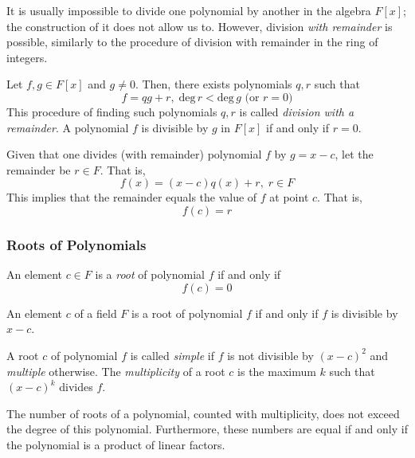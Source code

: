 \documentclass{article}
\begin{document}
      It is usually impossible to divide one polynomial by another in the algebra $F[x]$; the construction of it does not allow us to. However, division \textit{with remainder} is possible, similarly to the procedure of division with remainder in the ring of integers. 

      \begin{theorem}
        Let $f, g \in F[x]$ and $g \neq 0$. Then, there exists polynomials $q, r$ such that 
        \[ f = q g + r, \; \text{deg}\, r < \text{deg}\, g \text{ (or } r = 0 \text{)}\]
        This procedure of finding such polynomials $q, r$ is called \textit{division with a remainder}. A polynomial $f$ is divisible by $g$ in $F[x]$ if and only if $r = 0$. 
      \end{theorem}

      \begin{theorem}
        Given that one divides (with remainder) polynomial $f$ by $g = x - c$, let the remainder be $r \in F$. That is, 
        \[f(x) = (x-c) q(x) + r, \; r \in F\]
        This implies that the remainder equals the value of $f$ at point $c$. That is, 
        \[f(c) = r\]
      \end{theorem}

    \subsubsection{Roots of Polynomials}

      \begin{definition}
        An element $c \in F$ is a \textit{root} of polynomial $f$ if and only if 
        \[ f(c) = 0\]
      \end{definition}

      \begin{corollary}
        An element $c$ of a field $F$ is a root of polynomial $f$ if and only if $f$ is divisible by $x - c$. 
      \end{corollary}

      \begin{definition}
        A root $c$ of polynomial $f$ is called \textit{simple} if $f$ is not divisible by $(x-c)^2$ and \textit{multiple} otherwise. The \textit{multiplicity} of a root $c$ is the maximum $k$ such that $(x-c)^k$ divides $f$. 
      \end{definition}

      \begin{theorem}
        The number of roots of a polynomial, counted with multiplicity, does not exceed the degree of this polynomial. Furthermore, these numbers are equal if and only if the polynomial is a product of linear factors.
      \end{theorem}
\end{document}
